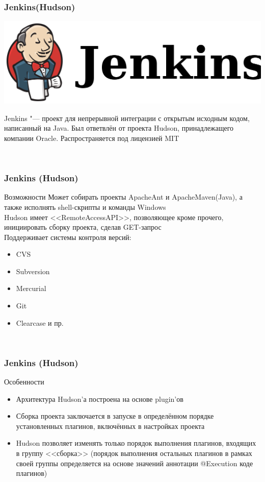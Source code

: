 \documentclass{../industrial-development}
\begin{document}
\lecturenotes

\begin{frame} \frametitle{Jenkins(Hudson)}
	\includegraphics[width=\textwidth]{jenkins}
	\begin{block}{}
		Jenkins "--- проект для непрерывной интеграции с открытым исходным кодом, написанный на Java. Был ответвлён от проекта Hudson, принадлежащего компании Oracle. Распространяется под лицензией MIT
	\end{block}
\end{frame}

\lecturenotes
~\cite{Wiki_Jenkins}

\begin{frame} \frametitle{Jenkins (Hudson)}
	\begin{block}{Возможности}
		Может собирать проекты ApacheAnt и ApacheMaven(Java), а также исполнять shell\nobreakdash-скрипты и команды Windows \\
		Hudson имеет <<RemoteAccessAPI>>, позволяющее кроме прочего, инициировать сборку проекта, сделав GET\nobreakdash-запрос \\
		Поддерживает системы контроля версий:
		\begin{itemize}
			\item CVS
			\item Subversion
			\item Mercurial
			\item Git
			\item Clearcase и пр.
		\end{itemize}	
	\end{block}
\end{frame}
\lecturenotes
~\cite{Habr_Hudson}

\begin{frame} \frametitle{Jenkins (Hudson)}
	\begin{block}{Особенности}
		\begin{itemize}
			\item Архитектура Hudson'а построена на основе plugin'ов
			\item Сборка проекта заключается в запуске в определённом порядке установленных плагинов, включённых в настройках проекта
			\item Hudson позволяет изменять только порядок выполнения плагинов, входящих в группу <<сборка>> (порядок выполнения остальных плагинов в рамках своей группы определяется на основе значений аннотации @Execution коде плагинов)
		\end{itemize}
	\end{block}
\end{frame}
\end{document}
